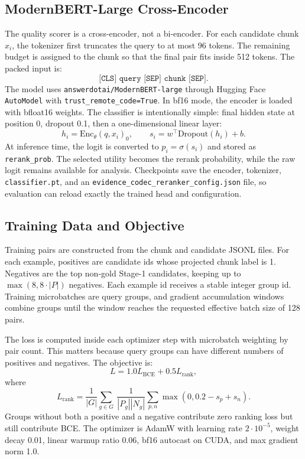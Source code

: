 \documentclass[10pt,twocolumn]{article}
\begin{document}
\subsection{ModernBERT-Large Cross-Encoder}
The quality scorer is a cross-encoder, not a bi-encoder. For each candidate chunk $x_i$, the tokenizer first truncates the query to at most 96 tokens. The remaining budget is assigned to the chunk so that the final pair fits inside 512 tokens. The packed input is:
\[
\texttt{[CLS] query [SEP] chunk [SEP]}.
\]
The model uses \texttt{answerdotai/ModernBERT-large} through Hugging Face \texttt{AutoModel} with \texttt{trust\_remote\_code=True}. In bf16 mode, the encoder is loaded with bfloat16 weights. The classifier is intentionally simple: final hidden state at position 0, dropout 0.1, then a one-dimensional linear layer:
\[
h_i = \mathrm{Enc}_{\theta}(q,x_i)_{0},\qquad s_i = w^\top \mathrm{Dropout}(h_i)+b.
\]
At inference time, the logit is converted to $p_i=\sigma(s_i)$ and stored as \texttt{rerank\_prob}. The selected utility becomes the rerank probability, while the raw logit remains available for analysis. Checkpoints save the encoder, tokenizer, \texttt{classifier.pt}, and an \texttt{evidence\_codec\_reranker\_config.json} file, so evaluation can reload exactly the trained head and configuration.

\subsection{Training Data and Objective}
Training pairs are constructed from the chunk and candidate JSONL files. For each example, positives are candidate ids whose projected chunk label is 1. Negatives are the top non-gold Stage-1 candidates, keeping up to $\max(8,8\cdot |P|)$ negatives. Each example id receives a stable integer group id. Training microbatches are query groups, and gradient accumulation windows combine groups until the window reaches the requested effective batch size of 128 pairs.

The loss is computed inside each optimizer step with microbatch weighting by pair count. This matters because query groups can have different numbers of positives and negatives. The objective is:
\[
L = 1.0 L_{\mathrm{BCE}} + 0.5 L_{\mathrm{rank}},
\]
where
\[
L_{\mathrm{rank}}=\frac{1}{|G|}\sum_{g \in G}\ \frac{1}{|P_g||N_g|}\sum_{p,n}\max(0,0.2-s_p+s_n).
\]
Groups without both a positive and a negative contribute zero ranking loss but still contribute BCE. The optimizer is AdamW with learning rate $2\cdot10^{-5}$, weight decay 0.01, linear warmup ratio 0.06, bf16 autocast on CUDA, and max gradient norm 1.0.
\end{document}
